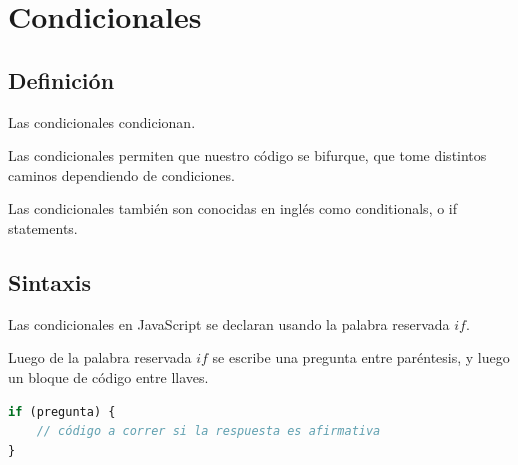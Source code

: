 \documentclass[../principal.tex]{subfiles}
\begin{document}
\chapter{Condicionales}

\section{Definición}

Las condicionales condicionan.

Las condicionales permiten que nuestro código se bifurque, que tome distintos caminos dependiendo de condiciones.

Las condicionales también son conocidas en inglés como conditionals, o if statements.

\section{Sintaxis}

Las condicionales en JavaScript se declaran usando la palabra reservada $if$.

Luego de la palabra reservada $if$ se escribe una pregunta entre paréntesis, y luego un bloque de código entre llaves.

\begin{lstlisting}[language=JavaScript]
if (pregunta) {
    // código a correr si la respuesta es afirmativa
}
\end{lstlisting}
\end{document}
